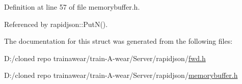 Definition at line 57 of file memorybuffer.\+h.



Referenced by rapidjson\+::\+Put\+N().



The documentation for this struct was generated from the following files\+:\begin{DoxyCompactItemize}
\item 
D\+:/cloned repo trainawear/train-\/\+A-\/wear/\+Server/rapidjson/\mbox{\hyperlink{fwd_8h}{fwd.\+h}}\item 
D\+:/cloned repo trainawear/train-\/\+A-\/wear/\+Server/rapidjson/\mbox{\hyperlink{memorybuffer_8h}{memorybuffer.\+h}}\end{DoxyCompactItemize}

